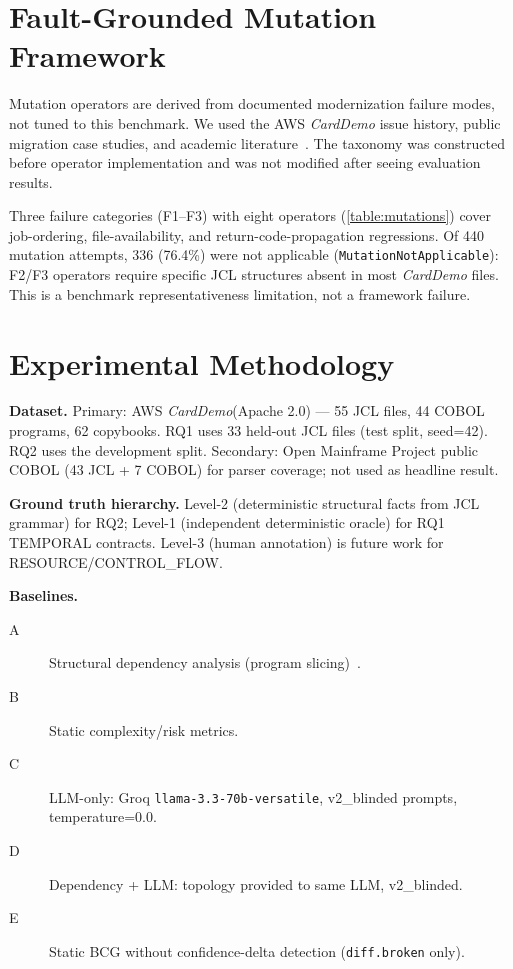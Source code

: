 \documentclass[sigconf,anonymous,review]{acmart}
\newcommand{\bcg}{\textsc{BCG}\xspace}
\newcommand{\carddemo}{\textit{CardDemo}\xspace}
\begin{document}
\section{Fault-Grounded Mutation Framework}\label{sec:mutations}

Mutation operators are derived from documented modernization failure modes, not tuned
to this benchmark.
We used the AWS \carddemo issue history, public migration case studies, and academic
literature~\cite{comella2000survey,ulrich2010information}.
The taxonomy was constructed before operator implementation and was not modified after
seeing evaluation results.

Three failure categories (F1--F3) with eight operators
(\cref{table:mutations}) cover job-ordering, file-availability, and
return-code-propagation regressions.
Of 440 mutation attempts, 336 (76.4\%) were not applicable
(\texttt{MutationNotApplicable}): F2/F3 operators require specific JCL structures
absent in most \carddemo files.
This is a benchmark representativeness limitation, not a framework failure.

\section{Experimental Methodology}\label{sec:methodology}

\textbf{Dataset.}
Primary: AWS \carddemo (Apache 2.0) --- 55 JCL files, 44 COBOL programs, 62
copybooks.
RQ1 uses 33 held-out JCL files (test split, seed=42).
RQ2 uses the development split.
Secondary: Open Mainframe Project public COBOL (43 JCL + 7 COBOL) for parser
coverage; not used as headline result.

\textbf{Ground truth hierarchy.}
Level-2 (deterministic structural facts from JCL grammar) for RQ2;
Level-1 (independent deterministic oracle) for RQ1 TEMPORAL contracts.
Level-3 (human annotation) is future work for RESOURCE/CONTROL\_FLOW.

\textbf{Baselines.}
\begin{description}
\item[A] Structural dependency analysis (program slicing)~\cite{tip1995slicing}.
\item[B] Static complexity/risk metrics.
\item[C] LLM-only: Groq \texttt{llama-3.3-70b-versatile}, v2\_blinded prompts,
  temperature=0.0.
\item[D] Dependency + LLM: topology provided to same LLM, v2\_blinded.
\item[E] Static \bcg without confidence-delta detection (\texttt{diff.broken} only).
\end{description}
\end{document}
